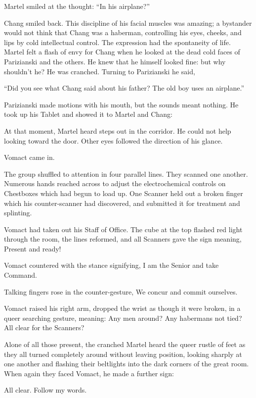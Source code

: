 Martel smiled at the thought: ``In his airplane?''

Chang smiled back. This discipline of his facial muscles was amazing; a bystander would not think that Chang was a haberman, controlling his eyes, cheeks, and lips by cold intellectual control. The expression had the spontaneity of life. Martel felt a flash of envy for Chang when he looked at the dead cold faces of Parizianski and the others. He knew that he himself looked fine: but why shouldn't he? He was cranched. Turning to Parizianski he said,

``Did you see what Chang said about his father? The old boy uses an airplane.''

Parizianski made motions with his mouth, but the sounds meant nothing. He took up his Tablet and showed it to Martel and Chang:


At that moment, Martel heard steps out in the corridor. He could not help looking toward the door. Other eyes followed the direction of his glance.

Vomact came in.

The group shuffled to attention in four parallel lines. They scanned one another. Numerous hands reached across to adjust the electrochemical controls on Chestboxes which had begun to load up. One Scanner held out a broken finger which his counter-scanner had discovered, and submitted it for treatment and splinting.

Vomact had taken out his Staff of Office. The cube at the top flashed red light through the room, the lines reformed, and all Scanners gave the sign meaning, Present and ready!

Vomact countered with the stance signifying, I am the Senior and take Command.

Talking fingers rose in the counter-gesture, We concur and commit ourselves.

Vomact raised his right arm, dropped the wrist as though it were broken, in a queer searching gesture, meaning: Any men around? Any habermans not tied? All clear for the Scanners?

Alone of all those present, the cranched Martel heard the queer rustle of feet as they all turned completely around without leaving position, looking sharply at one another and flashing their beltlights into the dark corners of the great room. When again they faced Vomact, he made a further sign:

All clear. Follow my words.

